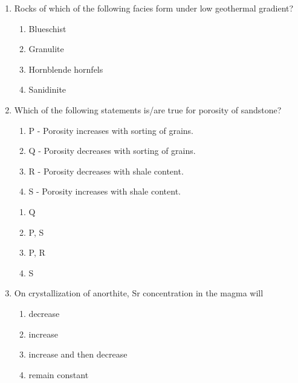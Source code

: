 \documentclass[journal,12pt,onecolumn]{IEEEtran}
\theoremstyle{remark}
\begin{document}
\begin{enumerate}
    \item Rocks of which of the following facies form under low geothermal gradient?

    \hfill{}
    
    \begin{multicols}{2}
        \begin{enumerate}
            \item Blueschist
            \item Granulite
            \item Hornblende hornfels
            \item Sanidinite
        \end{enumerate}
    \end{multicols}

    \item Which of the following statements is/are true for porosity of sandstone? 

    \begin{enumerate}
    \item P - Porosity increases with sorting of grains. 
    \item Q - Porosity decreases with sorting of grains. 
    \item R - Porosity decreases with shale content. 
    \item S - Porosity increases with shale content.   
    \end{enumerate}

    \hfill{}
    
    \begin{multicols}{4}
        \begin{enumerate}
            \item Q
            \item P, S
            \item P, R
            \item S
        \end{enumerate}
    \end{multicols}

    \item On crystallization of anorthite, Sr concentration in the magma will

    \hfill{}
    
    \begin{multicols}{2}
        \begin{enumerate}
            \item decrease
            \item increase
            \item increase and then decrease
            \item remain constant
        \end{enumerate}
    \end{multicols}


\end{enumerate}
\end{document}
